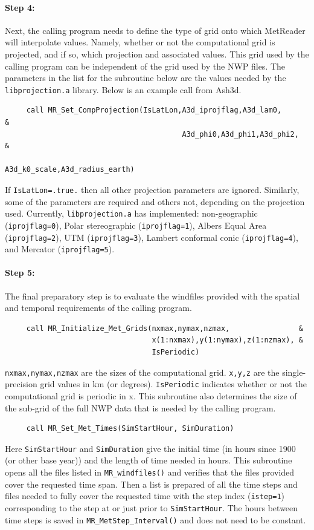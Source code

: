 \documentclass[11pt]{article}   %
\begin{document}
\paragraph{Step 4:} Next, the calling program needs to define the type of grid onto which MetReader 
will interpolate values.  Namely, whether or not the computational grid is projected, and if so,
which projection and associated values.  This grid used by the calling program can be independent
of the grid used by the NWP files.  The parameters in the list for the subroutine below are the values
needed by the \texttt{libprojection.a} library.  Below is an example call from Ash3d.
\begin{verbatim}
     call MR_Set_CompProjection(IsLatLon,A3d_iprojflag,A3d_lam0,           &
                                         A3d_phi0,A3d_phi1,A3d_phi2,       &
                                         A3d_k0_scale,A3d_radius_earth)
\end{verbatim}
If \texttt{IsLatLon=.true.} then all other projection parameters are ignored.  Similarly,
some of the parameters are required and others not, depending on the projection used.
Currently, \texttt{libprojection.a} has implemented: non-geographic (\texttt{iprojflag=0}),
Polar stereographic (\texttt{iprojflag=1}),
Albers Equal Area (\texttt{iprojflag=2}),
UTM (\texttt{iprojflag=3}),
Lambert conformal conic (\texttt{iprojflag=4}),
and Mercator (\texttt{iprojflag=5}).

\paragraph{Step 5:} The final preparatory step is to evaluate the windfiles provided
with the spatial and temporal requirements of the calling program.
\begin{verbatim}
     call MR_Initialize_Met_Grids(nxmax,nymax,nzmax,                &
                                  x(1:nxmax),y(1:nymax),z(1:nzmax), &
                                  IsPeriodic)
\end{verbatim}
\texttt{nxmax,nymax,nzmax} are the sizes of the computational grid. \texttt{x,y,z} are the
single-precision grid values in km (or degrees).  \texttt{IsPeriodic} indicates whether or
not the computational grid is periodic in x.  This subroutine also determines the size
of the sub-grid of the full NWP data that is needed by the calling program.
\begin{verbatim}
     call MR_Set_Met_Times(SimStartHour, SimDuration)
\end{verbatim}
Here \texttt{SimStartHour} and \texttt{SimDuration} give the initial time (in hours since 1900 (or
other base year)) and the length of time needed in hours.  This subroutine opens all the
files listed in \texttt{MR\_windfiles()} and verifies that the files provided cover the requested
time span.  Then a list is prepared of all the time steps and files needed to fully cover the 
requested time with the step index (\texttt{istep=1}) corresponding to the step at or
just prior to \texttt{SimStartHour}.
The hours between time steps is saved in \texttt{MR\_MetStep\_Interval()} and does not need to
be constant.
\end{document}
